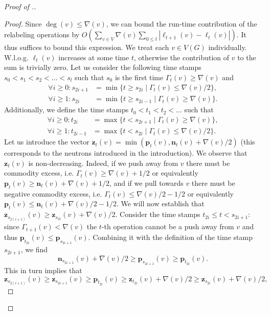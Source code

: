 \documentclass[11pt]{article}
\newcommand\bell{\boldsymbol{\mathit{\ell}}}
\begin{document}
\begin{proof}[Proof of .]
\begin{proof}
    Since $\deg(v) \leq \nabla(v)$, we can bound the run-time contribution of the relabeling operations by $O\left( \sum_{v \in V} \nabla(v) \sum_{0 \leq t} |\bell_{t+1}(v) - \bell_t(v)|\right)$. It thus suffices to bound this expression. We treat each $v \in V(G)$ individually. W.l.o.g. $\bell_t(v)$ increases at some time $t$, otherwise the contribution of $v$ to the sum is trivially zero. Let us consider the following time stamps $s_0 < s_1 < s_2 < \dots < s_l$ such that $s_0$ is the first time $\Gamma_t(v) \geq \nabla(v)$ and 
    \begin{align*}
        \forall i \geq 0: s_{2i + 1} &= \min\{t \geq s_{2i} \mid \Gamma_{t}(v) \leq \nabla(v)/2\}, \\
        \forall i \geq 1: s_{2i} &= \min\{t \geq s_{2i - 1} \mid \Gamma_t(v) \geq \nabla(v)\}.
    \end{align*}
    Additionally, we define the time stamps $t_0 < t_1 < t_2 < ... $ such that 
    \begin{align*}
        \forall i \geq 0: t_{2i} &= \max\{t < s_{2i + 1} \mid \Gamma_t(v) \geq \nabla(v)\}, \\
        \forall i \geq 1: t_{2i - 1} &= \max\{t < s_{2i} \mid \Gamma_t(v) \leq \nabla(v)/2\}.
    \end{align*}
    Let us introduce the vector $\textbf{z}_t(v) = \min(\textbf{p}_t(v), \textbf{n}_t(v) + \nabla(v)/2)$ (this corresponds to the neutrons introduced in the introduction). We observe that $\textbf{z}_t(v)$ is non-decreasing. Indeed, if we push away from $v$ there must be commodity excess, i.e. $\Gamma_t(v) \geq \nabla(v) + 1/2$ or equivalently $\textbf{p}_t(v) \geq \textbf{n}_t(v) + \nabla(v) + 1/2$, and if we pull towards $v$ there must be negative commodity excess, i.e. $\Gamma_t(v) \leq \nabla(v)/2 - 1/2$ or equivalently $\textbf{p}_t(v) \leq \textbf{n}_t(v) + \nabla(v)/2 - 1/2$. We will now establish that $\textbf{z}_{s_{2(i+1)}}(v) \geq \textbf{z}_{s_{2i}}(v) + \nabla(v)/2$. Consider the time stamps $t_{2i} \leq t < s_{2i+1}:$ since $\Gamma_{t+1}(v) < \nabla(v)$ the $t$-th operation cannot be a push away from $v$ and thus $\textbf{p}_{t_{2i}}(v) \leq \textbf{p}_{s_{2i+1}}(v)$. Combining it with the definition of the time stamp $s_{2i + 1}$, we find 
    \[\textbf{n}_{s_{2i + 1}}(v) + \nabla(v)/2 \geq \textbf{p}_{s_{2i + 1}}(v) \geq \textbf{p}_{t_{2i}}(v).\]
    This in turn implies that 
    \[\textbf{z}_{s_{2(i + 1)}}(v) \geq \textbf{z}_{s_{2i + 1}}(v) \geq \textbf{p}_{t_{2i}}(v) \geq \textbf{z}_{t_{2i}}(v) + \nabla(v)/2 \geq \textbf{z}_{s_{2i}}(v) + \nabla(v)/2,\]

\end{proof}
\end{proof}
\end{document}
